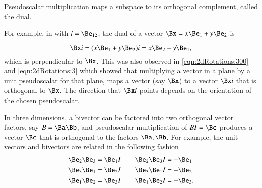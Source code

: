 %
%
Pseudoscalar multiplication maps a subspace to its orthogonal complement, called the dual.


For example, in  with \( i = \Be_{12} \), the dual of a vector \( \Bx = x \Be_1 + y \Be_2 \) is

\begin{dmath}\label{eqn:dual:n}
\Bx i =
(x \Be_1 + y \Be_2) i = x \Be_2 - y \Be_1,
\end{dmath}
which is perpendicular to \( \Bx \).
This was also observed in
\cref{eqn:2dRotations:300} and \cref{eqn:2dRotations:3} which showed that multiplying a vector in a plane by a unit pseudoscalar for that plane, maps a vector (say \( \Bx \)) to a vector \( \Bx i \) that is orthogonal to \( \Bx \).  The direction that \( \Bx i \) points depends on the orientation of the chosen pseudoscalar.
%
%

In three dimensions, a bivector can be factored into two orthogonal vector factors, say \( B = \Ba \Bb \), and
pseudoscalar multiplication of \( B I = \Bc \) produces a vector \( \Bc \) that is orthogonal to the factors \( \Ba, \Bb \).
For example, the unit vectors and bivectors are related in the following fashion
\begin{equation}\label{eqn:dual:1580}
\begin{aligned}
\Be_2 \Be_3 &= \Be_1 I \qquad \Be_2 \Be_3 I = -\Be_1 \\
\Be_3 \Be_1 &= \Be_2 I \qquad \Be_3 \Be_1 I = -\Be_2 \\
\Be_1 \Be_2 &= \Be_3 I \qquad \Be_1 \Be_2 I = -\Be_3.
\end{aligned}
\end{equation}

